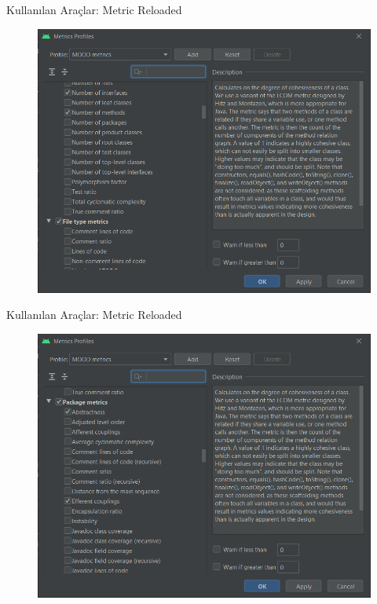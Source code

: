\documentclass[compress,xcolor=table]{beamer}
\begin{document}
\begin{frame}{Kullanılan Araçlar: Metric Reloaded}
\begin{figure}
\vspace{-.8cm}
   \includegraphics[width = \textwidth, height = 7.4 cm]{QMOODimage/android-metrik-3.png}
\end{figure}
\end{frame}
        
        \begin{frame}{Kullanılan Araçlar: Metric Reloaded}
\begin{figure}
\vspace{-.8cm}
   \includegraphics[width = \textwidth, height = 7.4 cm]{QMOODimage/android-metrik-4.png}
\end{figure}
\end{frame}
        
\end{document}

